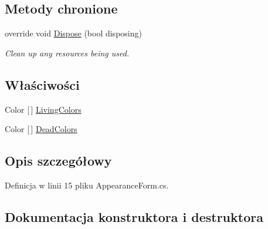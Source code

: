 \subsection*{Metody chronione}
\begin{DoxyCompactItemize}
\item 
override void \hyperlink{class_convay_1_1_win_forms_game_1_1_appearance_form_aa81652e532daf2a4968b5f2f5084790d}{Dispose} (bool disposing)
\begin{DoxyCompactList}\small\item\em Clean up any resources being used. \end{DoxyCompactList}\end{DoxyCompactItemize}
\subsection*{Właściwości}
\begin{DoxyCompactItemize}
\item 
Color \mbox{[}$\,$\mbox{]} \hyperlink{class_convay_1_1_win_forms_game_1_1_appearance_form_a1482f329de8b8cd0dda0ff5e8fa37567}{Living\+Colors}
\item 
Color \mbox{[}$\,$\mbox{]} \hyperlink{class_convay_1_1_win_forms_game_1_1_appearance_form_a348f1dddaf9f690022fe8975a6f3f3f9}{Dead\+Colors}
\end{DoxyCompactItemize}


\subsection{Opis szczegółowy}


Definicja w linii 15 pliku Appearance\+Form.\+cs.



\subsection{Dokumentacja konstruktora i destruktora}
\hypertarget{class_convay_1_1_win_forms_game_1_1_appearance_form_abf49c9dae804d8f082b71c1b37d0a5cd}{}\label{class_convay_1_1_win_forms_game_1_1_appearance_form_abf49c9dae804d8f082b71c1b37d0a5cd} 
